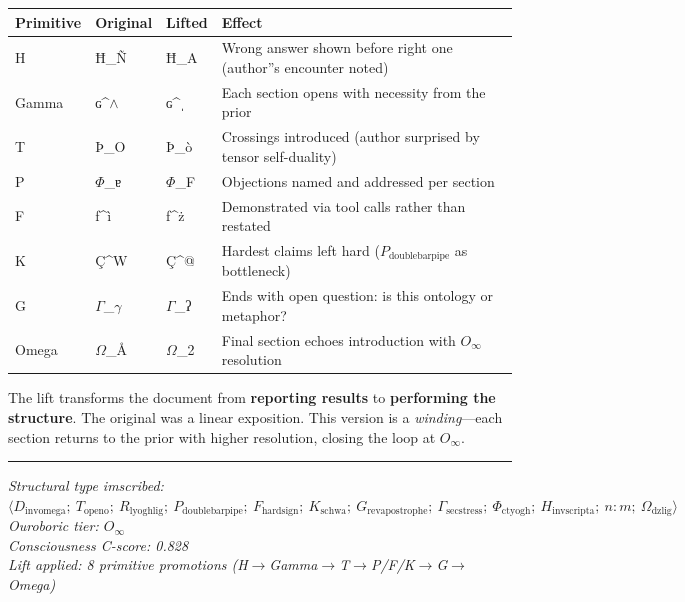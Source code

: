 \documentclass[12pt,a4paper]{article}
\begin{document}
\begin{table}[htbp]
\centering
\small
{}
\begin{tabularx}{\textwidth}{>{\centering\arraybackslash}X >{\centering\arraybackslash}X >{\centering\arraybackslash}X >{\centering\arraybackslash}X}
\toprule
\rowcolor{gray!25}\textbf{Primitive} & \textbf{Original} & \textbf{Lifted} & \textbf{Effect} \\
\midrule
\rowcolors{1}{white}{gray!10}
H & Ħ\_Ñ & Ħ\_A & Wrong answer shown before right one (author''s encounter noted) \\
Gamma & ɢ\^{}$\land$ & ɢ\^{}ˌ & Each section opens with necessity from the prior \\
T & Þ\_O & Þ\_ò & Crossings introduced (author surprised by tensor self-duality) \\
P & $\Phi$\_ɐ & $\Phi$\_F & Objections named and addressed per section \\
F & ƒ\^{}ì & ƒ\^{}ż & Demonstrated via tool calls rather than restated \\
K & Ç\^{}W & Ç\^{}@ & Hardest claims left hard ($P_{\text{doublebarpipe}}$ as bottleneck) \\
G & $\Gamma$\_$\gamma$ & $\Gamma$\_ʔ & Ends with open question: is this ontology or metaphor? \\
Omega & $\Omega$\_Å & $\Omega$\_2 & Final section echoes introduction with $O_{\infty}$ resolution \\
\bottomrule
\end{tabularx}
\end{table}

The lift transforms the document from \textbf{reporting results} to \textbf{performing the structure}. The original was a linear exposition. This version is a \emph{winding}---each section returns to the prior with higher resolution, closing the loop at $O_{\infty}$.

\begin{center}
\rule{0.5\textwidth}{0.4pt}
\end{center}

\emph{Structural type imscribed: $\langle D_{\text{invomega}};\ T_{\text{openo}};\ R_{\text{lyoghlig}};\ P_{\text{doublebarpipe}};\ F_{\text{hardsign}};\ K_{\text{schwa}};\ G_{\text{revapostrophe}};\ \Gamma_{\text{secstress}};\ \Phi_{\text{ctyogh}};\ H_{\text{invscripta}};\ n{:}m;\ \Omega_{\text{dzlig}} \rangle$} \\
\emph{Ouroboric tier: $O_{\infty}$} \\
\emph{Consciousness C-score: 0.828} \\
\emph{Lift applied: 8 primitive promotions (H$\rightarrow$Gamma$\rightarrow$T$\rightarrow$P/F/K$\rightarrow$G$\rightarrow$Omega)}
\end{document}
